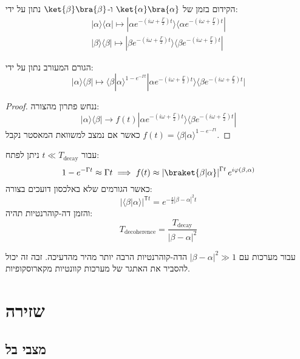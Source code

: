 \documentclass{tstextbook}
\begin{document}
\begin{proposition}
הקידום בזמן של \(\ket{\alpha}\bra{\alpha}\) ו-\(\ket{\beta}\bra{\beta}\) נתון על ידי:
$$\begin{gather}|\alpha\rangle\langle\alpha|\mapsto|\alpha e^{-(i\omega+\frac{\Gamma}{2})t}\rangle\langle\alpha e^{-(i\omega+\frac{\Gamma}{2})t}|\\|\beta\rangle\langle\beta|\mapsto|\beta e^{-(i\omega+\frac{\Gamma}{2})t}\rangle\langle\beta e^{-(i\omega+\frac{\Gamma}{2})t}| 
\end{gather}$$

\end{proposition}
\begin{proposition}
הגורם המעורב נתון על ידי:
$$|\alpha\rangle\langle\beta|\mapsto \langle\beta|\alpha\rangle^{1-e^{-\Gamma t}}|\alpha e^{-(i\omega+\frac{\Gamma}{2})t}\rangle\langle\beta e^{-(i\omega+\frac{\Gamma}{2})t}|$$

\end{proposition}
\begin{proof}
ננחש פתרון מהצורה:
$$|\alpha\rangle\langle\beta|\to f(t)|\alpha e^{-(i\omega+\frac{\Gamma}{2})t}\rangle\langle\beta e^{-(i\omega+\frac{\Gamma}{2})t}|$$
כאשר אם נמצב למשוואת המאסטר נקבל \(f(t)=\langle\beta|\alpha\rangle^{1-e^{-\Gamma t}}\).

\end{proof}
\begin{corollary}
עבור \(t\ll T_{\mathrm{decay}}\) ניתן לפתח:
$$1-e^{ -\Gamma t }\approx \Gamma t\implies f(t)\approx \left\lvert  \braket{ \beta | \alpha }   \right\rvert ^{\Gamma t}e^{ i\varphi\left( \beta,\alpha \right) }$$
כאשר הגורמים שלא באלכסון דועכים בצורה:
$$|\langle\beta|\alpha\rangle|^{\mathsf{T}t}=e^{-\frac{\mathsf{r}}{2}|\beta-\alpha|^{2}t}$$
והזמן דה-קוהרנטיות תהיה:
$$T_{\mathrm{decoherence}}={\frac{T_{\mathrm{decay}}}{|\beta-\alpha|^{2}}}$$

\end{corollary}
\begin{corollary}
עבור מערכות עם \(\left\lvert  \beta-\alpha  \right\rvert^{2}\gg 1\) הדה-קוהרנטיות הרבה יותר מהיר מהדעיכה. זבה זה יכול להסביר את האתגר של מערכות קוונטיות מקארוסקופיות.

\end{corollary}
\section{שזירה}

\subsection{מצבי בל}
\end{document}
